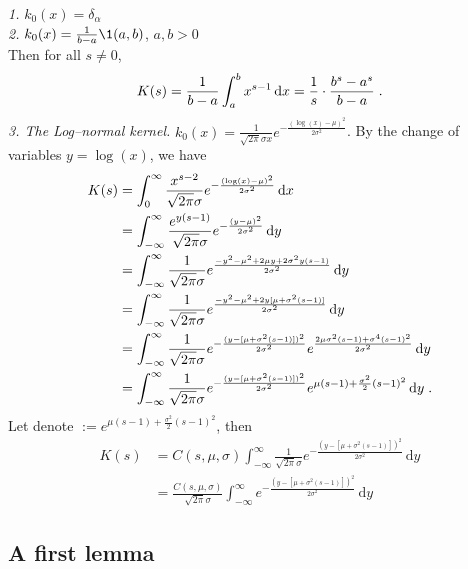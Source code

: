 \documentclass[11pt]{amsart}
\newcommand{\diff}{\,\mathrm{d}}
\begin{document}
\textit{1.} $k_0(x) = \delta_\alpha$ \\
\textit{2.} $k_0(x) = \frac{1}{b-a}\1{(a,b)}$, $a,b > 0$ \\
Then for all $s \neq 0$, 
    \begin{align*}
        K(s) = \frac{1}{b-a}\int_a^b x^{s-1}\diff x = \frac1s \cdot\frac{b^s - a^s}{b-a}
        \eqfinp
    \end{align*}
\textit{3. The Log--normal kernel.} $k_0(x) = \frac{1}{\sqrt{2\pi}\sigma x} e^{-\frac{(\log(x)-\mu)^2}{2\sigma^2}}$.
By the change of variables $y = \log(x)$, we have
    \begin{align*}
        K(s) 
        &= \int_0^\infty \frac{x^{s-2}}{\sqrt{2\pi}\sigma} e^{-\frac{(\log(x)-\mu)^2}{2\sigma^2}} \diff x \\
        &= \int_{-\infty}^\infty \frac{e^{y(s-1)}}{\sqrt{2\pi}\sigma} e^{-\frac{(y-\mu)^2}{2\sigma^2}} \diff y \\
        &=  \int_{-\infty}^\infty \frac{1}{\sqrt{2\pi}\sigma} e^{\frac{-y^2 - \mu^2 + 2\mu y + 2\sigma^2 y(s-1)}{2\sigma^2}} \diff y \\
        &=  \int_{-\infty}^\infty \frac{1}{\sqrt{2\pi}\sigma} e^{\frac{-y^2 - \mu^2 + 2y[\mu + \sigma^2 (s-1)]}{2\sigma^2}} \diff y \\
        &=  \int_{-\infty}^\infty \frac{1}{\sqrt{2\pi}\sigma} 
        e^{-\frac{(y - [\mu + \sigma^2 (s-1)])^2}{2\sigma^2}}
        e^{\frac{2\mu \sigma^2(s-1)+\sigma^4(s-1)^2}{2\sigma^2}}\diff y \\
        &=  \int_{-\infty}^\infty \frac{1}{\sqrt{2\pi}\sigma} 
        e^{-\frac{(y - [\mu + \sigma^2 (s-1)])^2}{2\sigma^2}}
        e^{\mu (s-1)+\frac{\sigma^2}{2}(s-1)^2}\diff y
        \eqfinp
    \end{align*}
Let denote $  := e^{\mu (s-1)+\frac{\sigma^2}{2}(s-1)^2}$, then 
\begin{align*}
    K(s) 
    &=  C(s,\mu,\sigma) \int_{-\infty}^\infty \frac{1}{\sqrt{2\pi}\sigma} 
        e^{-\frac{(y - [\mu + \sigma^2 (s-1)])^2}{2\sigma^2}}\diff y
        \\
        &=  \frac{C(s,\mu,\sigma)}{\sqrt{2\pi}\sigma} \int_{-\infty}^\infty
        e^{-\frac{(y - [\mu + \sigma^2 (s-1)])^2}{2\sigma^2}}\diff y
\end{align*}



\subsection{A first lemma}
\end{document}
